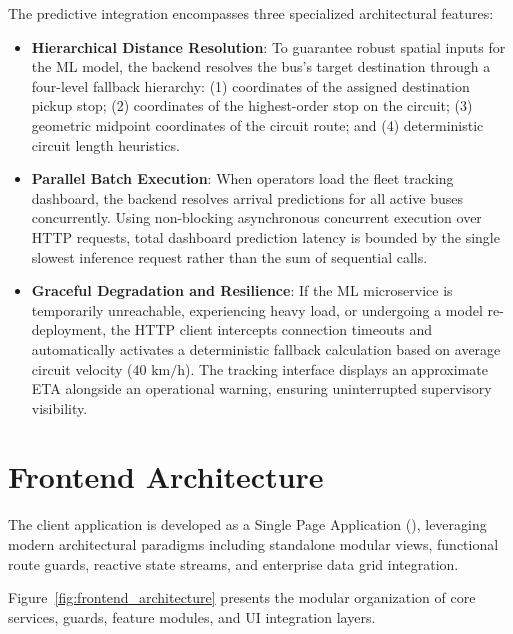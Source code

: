 The predictive integration encompasses three specialized architectural features:
\begin{itemize}
  \item \textbf{Hierarchical Distance Resolution}: To guarantee robust spatial inputs for the ML model, the backend resolves the bus's target destination through a four-level fallback hierarchy: (1) coordinates of the assigned destination pickup stop; (2) coordinates of the highest-order stop on the circuit; (3) geometric midpoint coordinates of the circuit route; and (4) deterministic circuit length heuristics.
  \item \textbf{Parallel Batch Execution}: When operators load the fleet tracking dashboard, the backend resolves arrival predictions for all active buses concurrently. Using non-blocking asynchronous concurrent execution over HTTP requests, total dashboard prediction latency is bounded by the single slowest inference request rather than the sum of sequential calls.
  \item \textbf{Graceful Degradation and Resilience}: If the ML microservice is temporarily unreachable, experiencing heavy load, or undergoing a model re-deployment, the HTTP client intercepts connection timeouts and automatically activates a deterministic fallback calculation based on average circuit velocity ($40\text{ km/h}$). The tracking interface displays an approximate ETA alongside an operational warning, ensuring uninterrupted supervisory visibility.
\end{itemize}

\section{Frontend Architecture}
\label{sec:frontend_architecture}

The client application is developed as a Single Page Application (), leveraging modern architectural paradigms including standalone modular views, functional route guards, reactive state streams, and enterprise data grid integration.

Figure~\ref{fig:frontend_architecture} presents the modular organization of core services, guards, feature modules, and UI integration layers.

